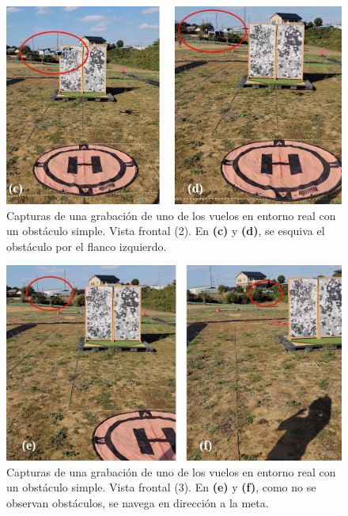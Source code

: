 \begin{figure}[H]
    \centering
    \includegraphics[scale=0.24]{partes/img/real-1-single-4-frames-2.png}
    \caption[Capturas de una grabación de uno de los vuelos en entorno real con un obstáculo simple. Vista frontal (2).]{Capturas de una grabación de uno de los vuelos en entorno real con un obstáculo simple. Vista frontal (2). En \textbf{(c)} y \textbf{(d)}, se esquiva el obstáculo por el flanco izquierdo.}
    \label{real-1-single-4-frames-2}
\end{figure}

\begin{figure}[H]
    \centering
    \includegraphics[scale=0.24]{partes/img/real-1-single-4-frames-3.png}
    \caption[Capturas de una grabación de uno de los vuelos en entorno real con un obstáculo simple. Vista frontal (3).]{Capturas de una grabación de uno de los vuelos en entorno real con un obstáculo simple. Vista frontal (3). En \textbf{(e)} y \textbf{(f)}, como no se observan obstáculos, se navega en dirección a la meta.}
    \label{real-1-single-4-frames-3}
\end{figure}

